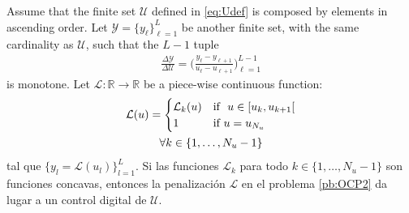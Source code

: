 \begin{theorem}
    Assume that the finite set $\mathcal{U}$ defined in \eqref{eq:Udef} is composed by elements in ascending order. Let $\mathcal{Y} = \{y_\ell\}_{\ell=1}^L$ be another finite set, with the same cardinality as $\mathcal U$, such that the $L-1$ tuple
    \begin{gather}
        \frac{\Delta \mathcal{Y}}{\Delta \mathcal{U}} = \Bigg( \frac{y_\ell - y_{\ell+1}}{u_\ell - u_{\ell+1}} \Bigg)_{\ell=1}^{L-1}
    \end{gather}  is monotone. Let $\mathcal{L}:\mathbb{R} \rightarrow \mathbb{R}$ be a piece-wise continuous function:
    \begin{gather}
        \mathcal{L}(u) = \begin{cases}
            \mathcal{L}_k(u) & \text{if }  u \in [u_k,u_{k+1}[ \\
            1 & \text{if } u = u_{N_u} 
        \end{cases} \\
        \notag \forall k \in \{1,\dots,N_u-1\}
    \end{gather}    
    tal que $\{y_l = \mathcal{L}(u_l)\}_{l=1}^L$. Si las funciones $\mathcal{L}_k$ para todo $k \in  \{1,\dots,N_u-1\}$  son funciones concavas, entonces la penalización $\mathcal{L}$ en el problema \ref{pb:OCP2} da lugar a un control digital de $\mathcal{U}$.
\end{theorem}